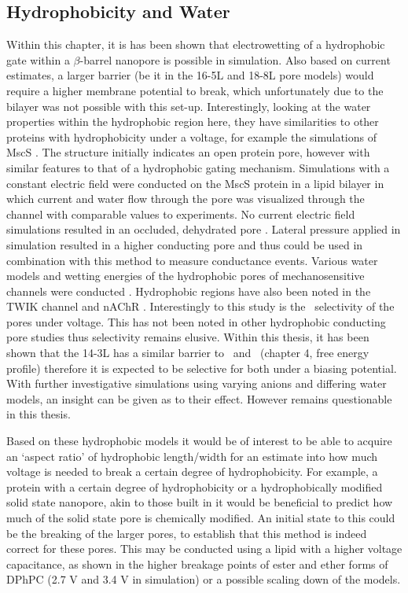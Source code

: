 \subsection{Hydrophobicity and Water}

Within this chapter, it is has been shown that electrowetting of a hydrophobic gate within a $\beta$-barrel nanopore is possible in simulation. Also based on current estimates, a larger barrier (be it in the 16-5L and 18-8L pore models) would require a higher membrane potential to break, which unfortunately due to the bilayer was not possible with this set-up. Interestingly, looking at the water properties within the hydrophobic region here, they have similarities to other proteins with hydrophobicity under a voltage, for example the simulations of MscS \cite{Spronk2006}. The structure initially indicates an open protein pore, however with similar features to that of a hydrophobic gating mechanism. Simulations with a constant electric field were conducted on the MscS protein in a lipid bilayer in which current and water flow through the pore was visualized through the channel with comparable values to experiments. No current electric field simulations resulted in an occluded, dehydrated pore \cite{Sotomayor2007}. Lateral pressure applied in simulation resulted in a higher conducting pore and thus could be used in combination with this method to measure conductance events.  Various water models and wetting energies of the hydrophobic pores of mechanosensitive channels were conducted \cite{Anishkin2010c}. Hydrophobic regions have also been noted in the TWIK channel  \cite{Aryal2014g} and nAChR \cite{Wang2008}. Interestingly to this study is the \Cl\ selectivity of the pores under voltage. This has not been noted in other hydrophobic conducting pore studies thus selectivity remains elusive. Within this thesis, it has been shown that the 14-3L has a similar barrier to \Cl\ and \Na\ (chapter 4, free energy profile) therefore it is expected to be selective for both under a biasing potential. With further investigative simulations using varying anions and differing water models, an insight can be given as to their effect. However remains questionable in this thesis.

Based on these hydrophobic models it would be of interest to be able to acquire an `aspect ratio' of hydrophobic length/width for an estimate into how much voltage is needed to break a certain degree of hydrophobicity. For example, a protein with a certain degree of hydrophobicity or a hydrophobically modified solid state nanopore, akin to those built in \cite{Powell2011} it would be beneficial to predict how much of the solid state pore is chemically modified. An initial state to this could be the breaking of the larger pores, to establish that this method is indeed correct for these pores. This may be conducted using a lipid with a higher voltage capacitance, as shown in the higher breakage points of ester and ether forms of DPhPC (2.7 V and 3.4 V in simulation) \cite{Polak2013} or a possible scaling down of the models. 

